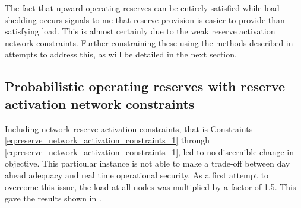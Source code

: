 \documentclass[number,times]{elsarticle}
\begin{document}
The fact that upward operating reserves can be entirely satisfied while load shedding occurs signals to me that reserve provision is easier to provide than satisfying load. This is almost certainly due to the weak reserve activation network constraints. Further constraining these using the methods described in  attempts to address this, as will be detailed in the next section.

\subsection{Probabilistic operating reserves with reserve activation network constraints}

Including network reserve activation constraints, that is Constraints \ref{eq:reserve_network_activation_constraints_1} through \ref{eq:reserve_network_activation_constraints_1}, led to no discernible change in objective. This particular instance is not able to make a trade-off between day ahead adequacy and real time operational security. As a first attempt to overcome this issue, the load at all nodes was multiplied by a factor of 1.5. This gave the results shown in .
\end{document}
